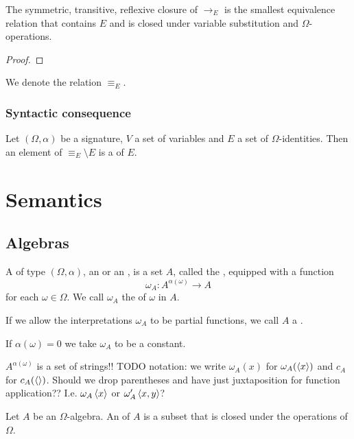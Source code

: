 \begin{lemma}
The symmetric, transitive, reflexive closure of $\to_E$ is the smallest equivalence relation that contains $E$ and is closed under variable substitution and $\Omega$-operations.
\end{lemma}
\begin{proof}

\end{proof}

\begin{definition}
We denote the relation $\equiv_E$.
\end{definition}

\subsubsection{Syntactic consequence}
\begin{definition}
Let $(\Omega, \alpha)$ be a signature, $V$ a set of variables and $E$ a set of $\Omega$-identities. Then an element of $\equiv_E\setminus E$ is a  of $E$.
\end{definition}

\section{Semantics}
\subsection{Algebras}
\begin{definition}
A  of type $(\Omega,\alpha)$, an  or an , is a set $A$, called the , equipped with a function
\[ \omega_A: A^{\alpha(\omega)}\to A \]
for each $\omega\in\Omega$. We call $\omega_A$ the  of $\omega$ in $A$.

If we allow the interpretations $\omega_A$ to be partial functions, we call $A$ a .

If $\alpha(\omega) = 0$ we take $\omega_A$ to be a constant.
\end{definition}


$A^{\alpha(\omega)}$ is a set of strings!!
TODO notation: we write $\omega_A(x)$ for $\omega_A(\left\langle x \right\rangle)$ and
$c_A$ for $c_A(\left\langle  \right\rangle)$. Should we drop parentheses and have just juxtaposition for function application?? I.e. $\omega_A\left\langle x \right\rangle$ or $\omega'_A\left\langle x,y \right\rangle$?


\begin{definition}
Let $A$ be an $\Omega$-algebra. An  of $A$ is a subset that is closed under the operations of $\Omega$.
\end{definition}

